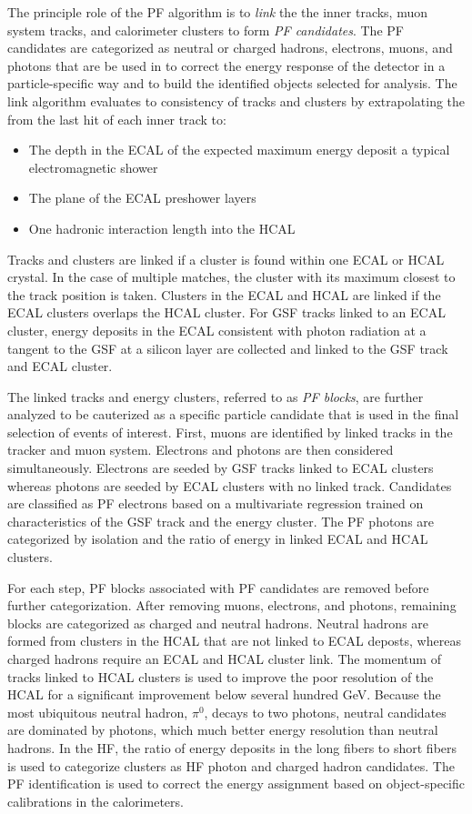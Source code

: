 The principle role of the PF algorithm is to \emph{link} the
the inner tracks, muon system tracks, and calorimeter clusters to form 
\emph{PF candidates}. The PF candidates are categorized as neutral or charged
hadrons, electrons, muons, and photons
that are be used in to correct the energy response
of the detector in a particle-specific way and to
build the identified objects selected for analysis. 
The link algorithm evaluates to consistency of tracks and clusters by
extrapolating the from the last hit of each inner track to:
\begin{itemize}
  \item The depth in the ECAL of the expected maximum energy deposit a typical electromagnetic shower
  \item The plane of the ECAL preshower layers
  \item One hadronic interaction length into the HCAL
\end{itemize}
Tracks and clusters are linked if a cluster is found within one
ECAL or HCAL crystal. In the case of multiple matches, the cluster
with its maximum closest to the track position is taken.
Clusters in the ECAL and HCAL are linked if the ECAL clusters overlaps
the HCAL cluster. For GSF tracks linked to an ECAL cluster, 
energy deposits in the ECAL consistent with photon radiation at 
a tangent to the GSF at a silicon layer are collected and linked to the
GSF track and ECAL cluster.

The linked tracks and energy clusters, referred to as \emph{PF blocks},
are further analyzed to be cauterized as a specific particle candidate
that is used in the final selection of events of interest. 
First, muons are identified by linked tracks in the tracker and muon system.
Electrons and photons are then considered simultaneously. Electrons
are seeded by GSF tracks linked to ECAL clusters whereas photons are seeded 
by ECAL clusters with no linked track. Candidates are classified as PF
electrons based on a multivariate regression trained on characteristics
of the GSF track and the energy cluster. The PF photons are categorized
by isolation and the ratio of energy in linked ECAL and HCAL clusters.

For each step, PF blocks associated with PF candidates are removed before
further categorization. After removing muons, electrons, and photons,
remaining blocks are categorized as charged and neutral hadrons.
Neutral hadrons are formed from clusters in the HCAL that are not linked
to ECAL deposts, whereas charged hadrons require an ECAL and HCAL
cluster link. 
The momentum of tracks linked to HCAL clusters is used to improve the poor
resolution of the HCAL for a significant improvement below several hundred GeV.
Because the most ubiquitous neutral hadron, $\pi^{0}$, decays
to two photons, neutral candidates are dominated by photons, which much
better energy resolution than neutral hadrons.
In the HF, the ratio of energy deposits in the long fibers to short fibers
is used to categorize clusters as HF photon and charged hadron candidates.
The PF identification is used to correct the energy assignment based on
object-specific calibrations in the calorimeters.

